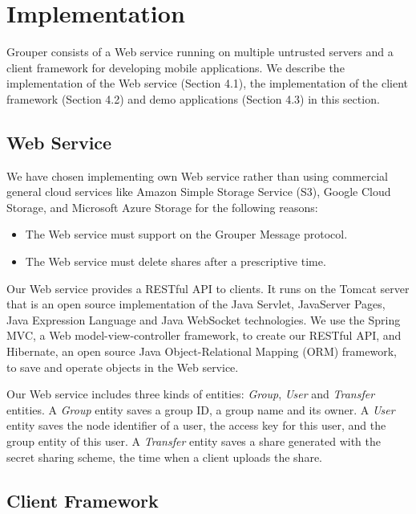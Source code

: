 \documentclass[twocolumn,10pt]{article}
\begin{document}
\section{Implementation}

Grouper consists of a Web service running on multiple untrusted servers and a client framework for developing mobile applications.
We describe the implementation of the Web service (Section 4.1), the implementation of the client framework (Section 4.2) and demo applications (Section 4.3) in this section.

\subsection{Web Service}

We have chosen implementing own Web service rather than using commercial general cloud services like Amazon Simple Storage Service (S3), Google Cloud Storage, and Microsoft Azure Storage for the following reasons:

\begin{itemize}
	\setlength{\itemsep}{1pt}
	\setlength{\parskip}{0pt}
	\setlength{\parsep}{0pt}
	\item The Web service must support on the Grouper Message protocol.
	\item The Web service must delete shares after a prescriptive time.
\end{itemize}

Our Web service provides a RESTful API to clients.
It runs on the Tomcat server that is an open source implementation of the Java Servlet, JavaServer Pages, Java Expression Language and Java WebSocket technologies\cite{tomcat}. 
We use the Spring MVC, a  Web model-view-controller framework, to create our RESTful API\cite{spring}, and Hibernate, an open source Java Object-Relational Mapping (ORM) framework, to save and operate objects in the Web service\cite{hibernate}. 

Our Web service includes three kinds of entities: \emph{Group}, \emph{User} and \emph{Transfer} entities. 
A \emph{Group} entity saves a group ID, a group name and its owner. 
A \emph{User} entity saves the node identifier of a user, the access key for this user, and the group entity of this user. 
A \emph{Transfer} entity saves a share generated with the secret sharing scheme, the time when a client uploads the share. 

\subsection{Client Framework}
\end{document}
